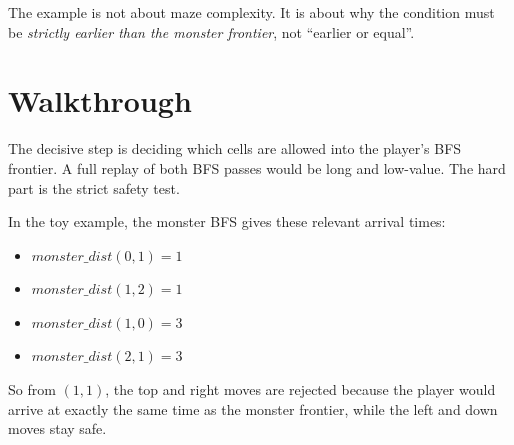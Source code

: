 The example is not about maze complexity. It is about why the condition must be
\textit{strictly earlier than the monster frontier}, not ``earlier or equal''.

\section{Walkthrough}

The decisive step is deciding which cells are allowed into the player's BFS
frontier. A full replay of both BFS passes would be long and low-value. The
hard part is the strict safety test.

In the toy example, the monster BFS gives these relevant arrival times:

\begin{itemize}
\item $monster\_dist(0,1) = 1$
\item $monster\_dist(1,2) = 1$
\item $monster\_dist(1,0) = 3$
\item $monster\_dist(2,1) = 3$
\end{itemize}

So from $(1,1)$, the top and right moves are rejected because the player would
arrive at exactly the same time as the monster frontier, while the left and
down moves stay safe.

